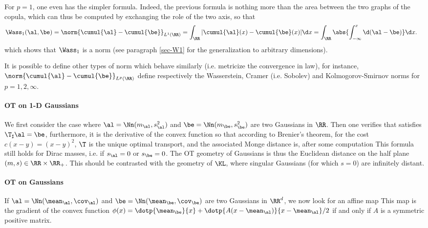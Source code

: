 For $p=1$, one even has the simpler formula. Indeed, the previous formula is nothing more than the area between the two graphs of the copula, which can thus be computed by exchanging the role of the two axis, so that 
\begin{align}\label{eq-w1-1d}
	\Wass_1(\al,\be) &= \norm{ \cumul{\al} - \cumul{\be} }_{L^1(\RR)} = 
	\int_\RR | \cumul{\al}(x) - \cumul{\be}(x) | \d x 
	= \int_\RR \abs{ \int_{-\infty}^x \d(\al-\be) } \d x.
\end{align}
which shows that $\Wass_1$ is a norm (see paragraph \ref{sec-W1} for the generalization to arbitrary dimensions). 

It is possible to define other types of norm which behave similarly (i.e. metricize the convergence in law), for instance, $\norm{ \cumul{\al} - \cumul{\be} }_{L^p(\RR)}$ define respectively the Wasserstein, Cramer (i.e. Sobolev) and Kolmogorov-Smirnov norms for $p=1,2,\infty$. 




\paragraph{OT on 1-D Gaussians}

We first consider the case where $\al = \Nn(m_\al,s_\al^2)$ and $\be = \Nn(m_\be,s_\be^2)$ are two Gaussians in $\RR$. 
%
Then one verifies that 
satisfies $\T_\sharp \al=\be$, furthermore, it is the derivative of the convex function 
so that according to Brenier's theorem, for the cost $c(x-y)=(x-y)^2$, $\T$ is the unique optimal transport, and the associated Monge distance is, after some computation
This formula still holds for Dirac masses, i.e. if $s_\al=0$ or $s_\be=0$.
%
The OT geometry of Gaussians is thus the Euclidean distance on the half plane $(m,s) \in \RR \times \RR_+$.
%
This should be contrasted with the geometry of $\KL$, where singular Gaussians (for which $s=0$) are infinitely distant. 

\paragraph{OT on Gaussians}


If $\al = \Nn(\mean_\al,\cov_\al)$ and $\be = \Nn(\mean_\be,\cov_\be)$ are two Gaussians in $\RR^\dims$, we now look for an affine map
This map is the gradient of the convex function $\phi(x) = \dotp{\mean_\be}{x} + \dotp{A(x-\mean_\al)}{x-\mean_\al}/2$ if and only if $A$ is a symmetric positive matrix. 

